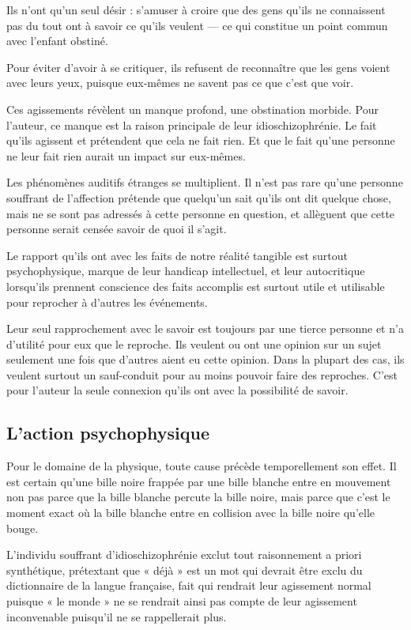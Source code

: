 \documentclass[12pt,oneside]{article}
\begin{document}
Ils n'ont qu'un seul désir : s'amuser à croire que des gens qu'ils ne connaissent pas du tout ont à savoir ce qu'ils veulent --- ce qui constitue un point commun avec l'enfant obstiné.

Pour éviter d'avoir à se critiquer, ils refusent de reconnaître que les gens voient avec leurs yeux, puisque eux-mêmes ne savent pas ce que c'est que voir.

Ces agissements révèlent un manque profond, une obstination morbide. Pour l'auteur, ce manque est la raison principale de leur idioschizophrénie. Le fait qu'ils agissent et prétendent que cela ne fait rien. Et que le fait qu'une personne ne leur fait rien aurait un impact sur eux-mêmes.

Les phénomènes auditifs étranges se multiplient. Il n'est pas rare qu'une personne souffrant de l'affection prétende que quelqu'un sait qu'ils ont dit quelque chose, mais ne se sont pas adressés à cette personne en question, et allèguent que cette personne serait censée savoir de quoi il s'agit.

Le rapport qu'ils ont avec les faits de notre réalité tangible est surtout psychophysique, marque de leur handicap intellectuel, et leur autocritique lorsqu'ils prennent conscience des faits accomplis est surtout utile et utilisable pour reprocher à d'autres les événements.

Leur seul rapprochement avec le savoir est toujours par une tierce personne et n'a d'utilité pour eux que le reproche. Ils veulent ou ont une opinion sur un sujet seulement une fois que d'autres aient eu cette opinion. Dans la plupart des cas, ils veulent surtout un sauf-conduit pour au moins pouvoir faire des reproches. C'est pour l'auteur la seule connexion qu'ils ont avec la possibilité de savoir.

\subsection{L'action psychophysique}

Pour le domaine de la physique, toute cause précède temporellement son effet. Il est certain qu'une bille noire frappée par une bille blanche entre en mouvement non pas parce que la bille blanche percute la bille noire, mais parce que c'est le moment exact où la bille blanche entre en collision avec la bille noire qu'elle bouge.

L'individu souffrant d'idioschizophrénie exclut tout raisonnement a priori synthétique, prétextant que « déjà » est un mot qui devrait être exclu du dictionnaire de la langue française, fait qui rendrait leur agissement normal puisque « le monde » ne se rendrait ainsi pas compte de leur agissement inconvenable puisqu'il ne se rappellerait plus.
\end{document}

